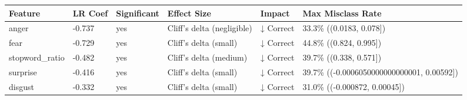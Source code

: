 \begin{tabular}{llllll}
\toprule
Feature & LR Coef & Significant & Effect Size & Impact & Max Misclass Rate \\
\midrule
anger & -0.737 & yes & Cliff's delta (negligible) & ↓ Correct & 33.3\% ((0.0183, 0.078]) \\
fear & -0.729 & yes & Cliff's delta (small) & ↓ Correct & 44.8\% ((0.824, 0.995]) \\
stopword\_ratio & -0.482 & yes & Cliff's delta (medium) & ↓ Correct & 39.7\% ((0.338, 0.571]) \\
surprise & -0.416 & yes & Cliff's delta (small) & ↓ Correct & 39.7\% ((-0.0006050000000000001, 0.00592]) \\
disgust & -0.332 & yes & Cliff's delta (small) & ↓ Correct & 31.0\% ((-0.000872, 0.00045]) \\
\bottomrule
\end{tabular}
